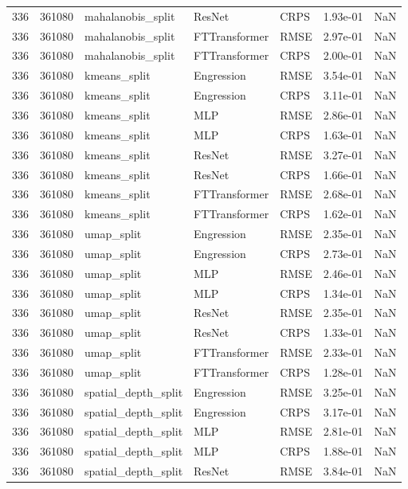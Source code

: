 \begin{tabular}{rrlllrr}
336 & 361080 & mahalanobis\_split & ResNet & CRPS & 1.93e-01 & NaN \\
336 & 361080 & mahalanobis\_split & FTTransformer & RMSE & 2.97e-01 & NaN \\
336 & 361080 & mahalanobis\_split & FTTransformer & CRPS & 2.00e-01 & NaN \\
336 & 361080 & kmeans\_split & Engression & RMSE & 3.54e-01 & NaN \\
336 & 361080 & kmeans\_split & Engression & CRPS & 3.11e-01 & NaN \\
336 & 361080 & kmeans\_split & MLP & RMSE & 2.86e-01 & NaN \\
336 & 361080 & kmeans\_split & MLP & CRPS & 1.63e-01 & NaN \\
336 & 361080 & kmeans\_split & ResNet & RMSE & 3.27e-01 & NaN \\
336 & 361080 & kmeans\_split & ResNet & CRPS & 1.66e-01 & NaN \\
336 & 361080 & kmeans\_split & FTTransformer & RMSE & 2.68e-01 & NaN \\
336 & 361080 & kmeans\_split & FTTransformer & CRPS & 1.62e-01 & NaN \\
336 & 361080 & umap\_split & Engression & RMSE & 2.35e-01 & NaN \\
336 & 361080 & umap\_split & Engression & CRPS & 2.73e-01 & NaN \\
336 & 361080 & umap\_split & MLP & RMSE & 2.46e-01 & NaN \\
336 & 361080 & umap\_split & MLP & CRPS & 1.34e-01 & NaN \\
336 & 361080 & umap\_split & ResNet & RMSE & 2.35e-01 & NaN \\
336 & 361080 & umap\_split & ResNet & CRPS & 1.33e-01 & NaN \\
336 & 361080 & umap\_split & FTTransformer & RMSE & 2.33e-01 & NaN \\
336 & 361080 & umap\_split & FTTransformer & CRPS & 1.28e-01 & NaN \\
336 & 361080 & spatial\_depth\_split & Engression & RMSE & 3.25e-01 & NaN \\
336 & 361080 & spatial\_depth\_split & Engression & CRPS & 3.17e-01 & NaN \\
336 & 361080 & spatial\_depth\_split & MLP & RMSE & 2.81e-01 & NaN \\
336 & 361080 & spatial\_depth\_split & MLP & CRPS & 1.88e-01 & NaN \\
336 & 361080 & spatial\_depth\_split & ResNet & RMSE & 3.84e-01 & NaN \\

\end{tabular}
